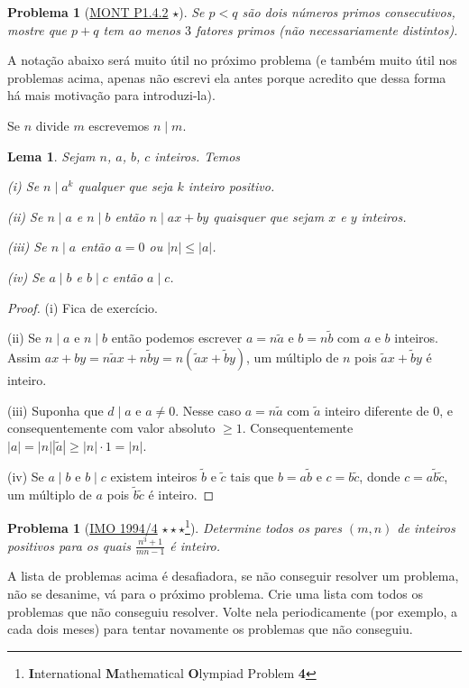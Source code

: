 \documentclass{article}
\newtheorem{problem}[theorem]{Problema}
\newtheorem{lemma}[theorem]{Lema}
\begin{document}
\begin{problem}[\href{https://artofproblemsolving.com/community/c1610044h2349405_problem_142}{MONT P1.4.2} $\star$]
Se $p < q$ são dois números primos consecutivos, mostre que $p + q$ tem ao menos $3$ fatores primos (não necessariamente distintos).
\end{problem}

A notação abaixo será muito útil no próximo problema (e também muito útil nos problemas acima, apenas não escrevi ela antes porque acredito que dessa forma há mais motivação para introduzi-la).

Se $n$ divide $m$ escrevemos $n \mid m$.

\begin{lemma}
  Sejam $n$, $a$, $b$, $c$ inteiros. Temos

  (i) Se $n \mid a^k$ qualquer que seja $k$ inteiro positivo.

  (ii) Se $n \mid a$ e $n \mid b$ então $n \mid a x + b y$ quaisquer que sejam $x$ e $y$ inteiros.

  (iii) Se $n \mid a$ então $a = 0$ ou $|n| \le |a|$.

  (iv) Se $a \mid b$ e $b \mid c$ então $a \mid c$.
\end{lemma}
\begin{proof}
  (i) Fica de exercício.

  (ii) Se $n \mid a$ e $n \mid b$ então podemos escrever $a = n \tilde{a}$ e $b = n \tilde{b}$ com $a$ e $b$ inteiros. Assim $a x + b y = n \tilde{a} x + n \tilde{b} y = n (\tilde{a} x + \tilde{b} y)$, um múltiplo de $n$ pois $\tilde{a} x + \tilde{b} y$ é inteiro.

  (iii) Suponha que $d \mid a$ e $a \ne 0$. Nesse caso $a = n \tilde{a}$ com $\tilde{a}$ inteiro diferente de $0$, e consequentemente com valor absoluto $\ge 1$. Consequentemente $|a| = |n| |\tilde{a}| \ge |n| \cdot 1 = |n|$.

  (iv) Se $a \mid b$ e $b \mid c$ existem inteiros $\tilde{b}$ e $\tilde{c}$ tais que $b = a \tilde{b}$ e $c = b \tilde{c}$, donde $c = a \tilde{b} \tilde{c}$, um múltiplo de $a$ pois $\tilde{b} \tilde{c}$ é inteiro.
\end{proof}

\begin{problem}[\href{https://artofproblemsolving.com/wiki/index.php/1994_IMO_Problems/Problem_4}{IMO 1994/4} $\star \star \star$\footnote{\textbf{I}nternational \textbf{M}athematical \textbf{O}lympiad Problem \textbf{4}}]
Determine todos os pares $(m, n)$ de inteiros positivos para os quais $\frac{n^3 + 1}{mn - 1}$ é inteiro.
\end{problem}

A lista de problemas acima é desafiadora, se não conseguir resolver um problema, não se desanime, vá para o próximo problema. Crie uma lista com todos os problemas que não conseguiu resolver. Volte nela periodicamente (por exemplo, a cada dois meses) para tentar novamente os problemas que não conseguiu.
\end{document}

